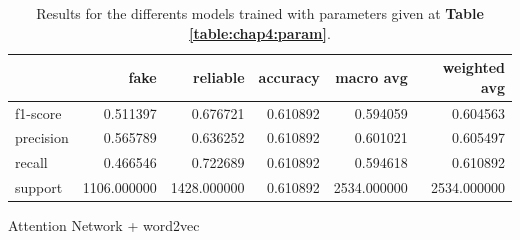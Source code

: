 \begin{table}
\begin{subtable}{\textwidth}
\begin{tabular}{lrrrrr}
\toprule
{} &         fake &     reliable &  accuracy &    macro avg &  weighted avg \\
\midrule
f1-score  &     0.511397 &     0.676721 &  0.610892 &     0.594059 &      0.604563 \\
precision &     0.565789 &     0.636252 &  0.610892 &     0.601021 &      0.605497 \\
recall    &     0.466546 &     0.722689 &  0.610892 &     0.594618 &      0.610892 \\
support   &  1106.000000 &  1428.000000 &  0.610892 &  2534.000000 &   2534.000000 \\
\bottomrule
\end{tabular}
\caption{Attention Network + word2vec}
\end{subtable}
\caption{Results for the differents models trained with parameters given at \textbf{Table \ref{table:chap4:param}}.}
\label{table:chap4:results}
\end{table}